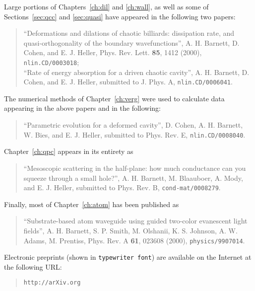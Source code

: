 \begin{citations}

\vspace{0.8in}

\ssp
\noindent
Large portions of Chapters~\ref{ch:dil} and \ref{ch:wall}, as well as some
of Sections~\ref{sec:qcc} and \ref{sec:quasi}\cite{art1}
have appeared in the following two papers:
\begin{quote}
	``Deformations and dilations of chaotic billiards:
	dissipation rate, and quasi-orthogonality of the boundary
	wavefunctions'',
	A. H. Barnett, D. Cohen, and E. J. Heller,
	Phys. Rev. Lett. {\bf 85}, 1412 (2000), {\tt nlin.CD/0003018};
	\vspace{.1in} \\
	``Rate of energy absorption for a driven chaotic cavity'',
	A. H. Barnett, D. Cohen, and E. J. Heller,
	submitted to J. Phys. A, {\tt nlin.CD/0006041}.
\end{quote}
The numerical methods of
Chapter~\ref{ch:verg} were used to calculate data appearing in the above
papers and in the following:
\begin{quote}
	``Parametric evolution for a deformed cavity'',
	D. Cohen, A. H. Barnett, W. Bies, and E. J. Heller,
	submitted to Phys. Rev. E, {\tt nlin.CD/0008040}.
\end{quote}
Chapter~\ref{ch:qpc} appears in its entirety as
\begin{quote}
	``Mesoscopic scattering in the half-plane:
	how much conductance can you squeeze through a small hole?'',
	A. H. Barnett, M. Blaauboer, A. Mody, and E. J. Heller,
	submitted to Phys. Rev. B,
	{\tt cond-mat/0008279}.
\end{quote}
Finally, most of Chapter~\ref{ch:atom} has been published as
\begin{quote}
	``Substrate-based atom waveguide using guided two-color
	evanescent light fields'',
	A. H. Barnett, S. P. Smith, M. Olshanii, K. S. Johnson,
	A. W. Adams, M. Prentiss,
	Phys. Rev. A {\bf 61}, 023608 (2000), {\tt physics/9907014}.
\end{quote}
Electronic preprints (shown in {\tt typewriter font}) are available
on the Internet at the following URL:
\begin{quote}
	{\tt http://arXiv.org}
\end{quote}
\end{citations}




